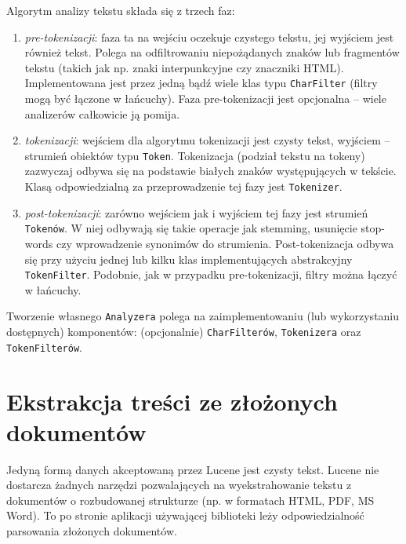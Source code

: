 Algorytm analizy tekstu składa się z trzech faz:
\begin{enumerate}
 \item \emph{pre-tokenizacji}: faza ta na wejściu oczekuje czystego tekstu, jej wyjściem jest również tekst. Polega na odfiltrowaniu niepożądanych znaków lub fragmentów tekstu (takich jak np. znaki interpunkcyjne czy znaczniki HTML). Implementowana jest przez jedną bądź wiele klas typu \texttt{CharFilter} (filtry mogą być łączone w łańcuchy). Faza pre-tokenizacji jest opcjonalna -- wiele analizerów całkowicie ją pomija.
 \item \emph{tokenizacji}: wejściem dla algorytmu tokenizacji jest czysty tekst, wyjściem -- strumień obiektów typu \texttt{Token}. Tokenizacja (podział tekstu na tokeny) zazwyczaj odbywa się na podstawie białych znaków występujących w tekście. Klasą odpowiedzialną za przeprowadzenie tej fazy jest \texttt{Tokenizer}.
 \item \emph{post-tokenizacji}: zarówno wejściem jak i wyjściem tej fazy jest strumień \texttt{Tokenów}. W niej odbywają się takie operacje jak stemming, usunięcie stop-words czy wprowadzenie synonimów do strumienia. Post-tokenizacja odbywa się przy użyciu  jednej lub kilku klas implementujących abstrakcyjny \texttt{TokenFilter}. Podobnie, jak w przypadku pre-tokenizacji, filtry można łączyć w łańcuchy.
\end{enumerate}

Tworzenie własnego \texttt{Analyzera} polega na zaimplementowaniu (lub wykorzystaniu dostępnych) komponentów: (opcjonalnie) \texttt{CharFilterów}, \texttt{Tokenizera} oraz \texttt{TokenFilterów}. 

\section{Ekstrakcja treści ze złożonych dokumentów}

Jedyną formą danych akceptowaną przez Lucene jest czysty tekst. Lucene nie dostarcza żadnych narzędzi pozwalających na wyekstrahowanie tekstu z dokumentów o rozbudowanej strukturze (np. w formatach HTML, PDF, MS Word). To po stronie aplikacji używającej biblioteki leży odpowiedzialność parsowania złożonych dokumentów. 